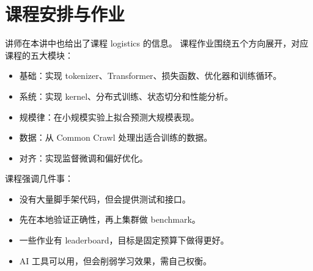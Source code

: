 \section{课程安排与作业}

讲师在本讲中也给出了课程 logistics 的信息。
课程作业围绕五个方向展开，对应课程的五大模块：
\begin{itemize}
    \item 基础：实现 tokenizer、Transformer、损失函数、优化器和训练循环。
    \item 系统：实现 kernel、分布式训练、状态切分和性能分析。
    \item 规模律：在小规模实验上拟合预测大规模表现。
    \item 数据：从 Common Crawl 处理出适合训练的数据。
    \item 对齐：实现监督微调和偏好优化。
\end{itemize}

课程强调几件事：
\begin{itemize}
    \item 没有大量脚手架代码，但会提供测试和接口。
    \item 先在本地验证正确性，再上集群做 benchmark。
    \item 一些作业有 leaderboard，目标是固定预算下做得更好。
    \item AI 工具可以用，但会削弱学习效果，需自己权衡。
\end{itemize}

